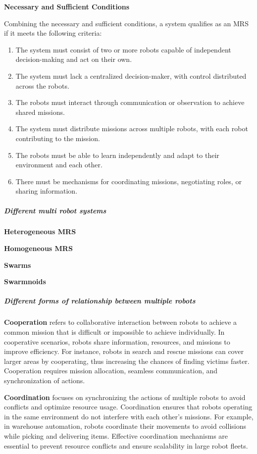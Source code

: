 \documentclass{book}
\providecommand{\ProjectDeepHeading}[2]{%
    \par\medskip\noindent\textbf{#2}\par\smallskip
}
\begin{document}
\ProjectDeepHeading{1}{Necessary and Sufficient Conditions}
Combining the necessary and sufficient conditions, a system qualifies as an MRS if it meets the following criteria:

\begin{enumerate}
    \item The system must consist of two or more robots capable of independent decision-making and act on their own.
    \item The system must lack a centralized decision-maker, with control distributed across the robots. 
    \item The robots must interact through communication or observation to achieve shared missions.
    \item The system must distribute missions across multiple robots, with each robot contributing to the mission.
    \item The robots must be able to learn independently and adapt to their environment and each other. 
    \item There must be mechanisms for coordinating missions, negotiating roles, or sharing information.
\end{enumerate}


\subparagraph{Different multi robot systems}

\textbf{Heterogeneous MRS}

\textbf{Homogeneous MRS}

\textbf{Swarms} 

\textbf{Swarmnoids}



\subparagraph{Different forms of relationship between multiple robots}

\textbf{Cooperation} refers to collaborative interaction between robots to achieve a common mission that is difficult or impossible to achieve individually. In cooperative scenarios, robots share information, resources, and missions to improve efficiency. For instance, robots in search and rescue missions can cover larger areas by cooperating, thus increasing the chances of finding victims faster. Cooperation requires mission allocation, seamless communication, and synchronization of actions.

\textbf{Coordination} focuses on synchronizing the actions of multiple robots to avoid conflicts and optimize resource usage. Coordination ensures that robots operating in the same environment do not interfere with each other’s missions. For example, in warehouse automation, robots coordinate their movements to avoid collisions while picking and delivering items. Effective coordination mechanisms are essential to prevent resource conflicts and ensure scalability in large robot fleets.
\end{document}
